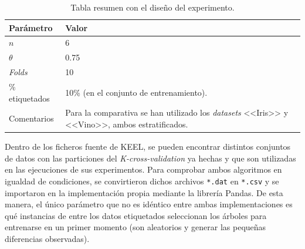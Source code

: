 \begin{table}
	\begin{centering}
		\begin{tabular}{@{}p{10em} p{20em} @{}}
			\toprule
			\textbf{Parámetro} & \textbf{Valor} \\ 
			\midrule
			$n$ & 6\\
			$\theta$ & 0.75 \\
			\textit{Folds} & 10 \\
			\% etiquetados & 10\% (en el conjunto de entrenamiento). \\
			Comentarios & Para la comparativa se han utilizado los \textit{datasets} <<Iris>> y <<Vino>>, ambos estratificados.\\
			\bottomrule
			
		\end{tabular}
	\end{centering}
	\caption{Tabla resumen con el diseño del experimento.}
	\label{tabla_coforest_keelvsnuestro_diseño}	
\end{table}

Dentro de los ficheros fuente de KEEL, se pueden encontrar distintos conjuntos de datos con las particiones del \textit{K-cross-validation} ya hechas y que son utilizadas en las ejecuciones de sus experimentos. Para comprobar ambos algoritmos en igualdad de condiciones, se convirtieron dichos archivos \texttt{*.dat} en \texttt{*.csv} y se importaron en la implementación propia mediante la librería Pandas. De esta manera, el único parámetro que no es idéntico entre ambas implementaciones es qué instancias de entre los datos etiquetados seleccionan los árboles para entrenarse en un primer momento (son aleatorios y generar las pequeñas diferencias observadas).

